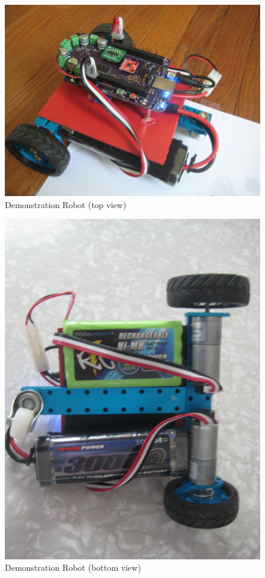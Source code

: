 \documentclass[12pt,oneside,final]{siuethesis}
\theoremstyle{definition}
\begin{document}
\begin{figure}[htbp!]
 \centering
 \includegraphics[scale=0.1,keepaspectratio=true]{./images_ch4/robot_top.JPG}
 \caption{Demonstration Robot (top view)}
 \label{fig:robot_top}
\end{figure}

\begin{figure}[htbp!]
 \centering
 \includegraphics[scale=0.1,keepaspectratio=true]{./images_ch4/robot_bot.JPG}
 \caption{Demonstration Robot (bottom view)}
 \label{fig:robot_bot}
\end{figure}
\end{document}
